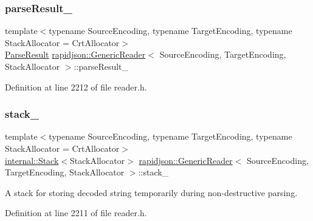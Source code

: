 \subsubsection{\texorpdfstring{parseResult\_}{parseResult\_}}
{\footnotesize\ttfamily template$<$typename Source\+Encoding, typename Target\+Encoding, typename Stack\+Allocator = Crt\+Allocator$>$ \\
\mbox{\hyperlink{structrapidjson_1_1_parse_result}{Parse\+Result}} \mbox{\hyperlink{classrapidjson_1_1_generic_reader}{rapidjson\+::\+Generic\+Reader}}$<$ Source\+Encoding, Target\+Encoding, Stack\+Allocator $>$\+::parse\+Result\+\_\+\hspace{0.3cm}{\ttfamily [private]}}



Definition at line 2212 of file reader.\+h.

\mbox{\label{classrapidjson_1_1_generic_reader_a0d65c1197dc873768616af8fab890e1a}} 
\subsubsection{\texorpdfstring{stack\_}{stack\_}}
{\footnotesize\ttfamily template$<$typename Source\+Encoding, typename Target\+Encoding, typename Stack\+Allocator = Crt\+Allocator$>$ \\
\mbox{\hyperlink{classrapidjson_1_1internal_1_1_stack}{internal\+::\+Stack}}$<$Stack\+Allocator$>$ \mbox{\hyperlink{classrapidjson_1_1_generic_reader}{rapidjson\+::\+Generic\+Reader}}$<$ Source\+Encoding, Target\+Encoding, Stack\+Allocator $>$\+::stack\+\_\+\hspace{0.3cm}{\ttfamily [private]}}



A stack for storing decoded string temporarily during non-\/destructive parsing. 



Definition at line 2211 of file reader.\+h.

\mbox{\label{classrapidjson_1_1_generic_reader_a2c575bbd7365a8fc34bb20978aa4e361}} 
